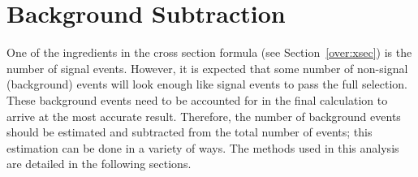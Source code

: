 





\section{Background Subtraction}
\label{anMeth:BGSub}
One of the ingredients in the cross section formula 
(see Section~\ref{over:xsec}) 
is the number of signal events.  
However, it is expected that some number of non-signal 
(background) events %
will look enough like signal events to pass the full selection.  
These background events need to be accounted for 
in the final calculation to arrive 
at the most accurate result.  
Therefore, the number of background events should 
be estimated and subtracted from the total number 
of events; 
this estimation can be done in a variety of ways.  
The methods used in this analysis are detailed 
in the following sections.  




